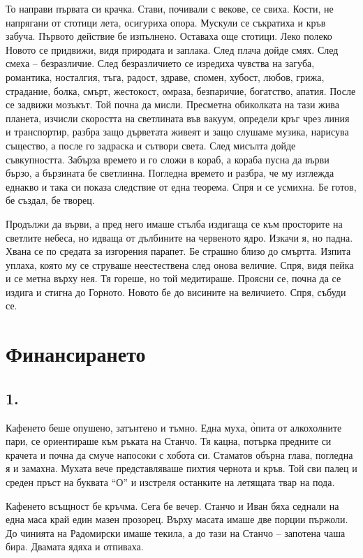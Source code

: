 \documentclass[ebook,openany,12pt]{memoir}
\begin{document}
То направи първата си крачка. Стави, почивали с векове, се свиха. Кости, не напрягани от стотици лета, осигуриха опора. Мускули се съкратиха и кръв забуча. Първото действие бе изпълнено. Оставаха още стотици. Леко полеко Новото се придвижи, видя природата и заплака. След плача дойде смях. След смеха – безразличие. След безразличието се изредиха чувства на загуба, романтика, носталгия, тъга, радост, здраве, спомен, хубост, любов, грижа, страдание, болка, смърт, жестокост, омраза, безпаричие, богатство, апатия. После се задвижи мозъкът. Той почна да мисли. Пресметна обиколката на тази жива планета, изчисли скоростта на светлината във вакуум, определи кръг чрез линия и транспортир, разбра защо дърветата живеят и защо слушаме музика, нарисува същество, а после го задраска и сътвори света. След мисълта дойде съвкупността. Забърза времето и го сложи в кораб, а кораба пусна да върви бързо, а бързината бе светлинна. Погледна времето и разбра, че му изглежда еднакво и така си показа следствие от една теорема. Спря и се усмихна. Бе готов, бе създал, бе творец.

Продължи да върви, а пред него имаше стълба издигаща се към просторите на светлите небеса, но идваща от дълбините на червеното ядро. Изкачи я, но падна. Хвана се по средата за изгорения парапет. Бе страшно близо до смъртта. Изпита уплаха, която му се струваше неестествена след онова величие. Спря, видя пейка и се метна върху нея. Тя гореше, но той медитираше. Проясни се, почна да се издига и стигна до Горното. Новото бе до висините на величието. Спря, събуди се.

\chapter{Финансирането}

\section*{1.}

Кафенето беше опушено, затънтено и тъмно. Една муха, \`{о}пита от алкохолните пари, се ориентираше към ръката на Станчо. Тя кацна, потърка предните си крачета и почна да смуче напосоки с хобота си. Стаматов обърна глава, погледна я и замахна. Мухата вече представляваше пихтия чернота и кръв. Той сви палец и среден пръст на буквата ``О'' и изстреля останките на летящата твар на пода.

Кафенето всъщност бе кръчма. Сега бе вечер. Станчо и Иван бяха седнали на една маса край един мазен прозорец. Върху масата имаше две порции пържоли. До чинията на Радомирски имаше текила, а до тази на Станчо – запотена чаша бира. Двамата ядяха и отпиваха.
\end{document}
